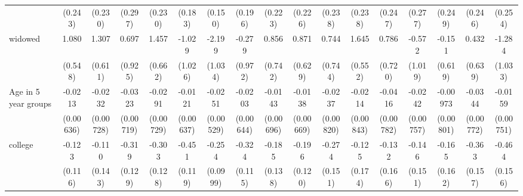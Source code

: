 {\begin{tabular}{l*{16}{c}}
                    &     (0.243)         &     (0.230)         &     (0.297)         &     (0.230)         &     (0.183)         &     (0.150)         &     (0.196)         &     (0.223)         &     (0.226)         &     (0.238)         &     (0.238)         &     (0.247)         &     (0.277)         &     (0.249)         &     (0.246)         &     (0.254)         \\
[1em]
widowed             &       1.080\sym{*}  &       1.307\sym{*}  &       0.697         &       1.457\sym{*}  &      -1.029         &      -2.199\sym{*}  &      -0.279         &       0.856         &       0.871         &       0.744         &       1.645\sym{**} &       0.786         &      -0.572         &      -0.151         &       0.432         &      -1.284         \\
                    &     (0.548)         &     (0.611)         &     (0.925)         &     (0.662)         &     (1.026)         &     (1.034)         &     (0.972)         &     (0.742)         &     (0.629)         &     (0.744)         &     (0.552)         &     (0.720)         &     (1.019)         &     (0.619)         &     (0.639)         &     (1.033)         \\
[1em]
Age in 5 year groups&     -0.0213\sym{***}&     -0.0232\sym{**} &     -0.0323\sym{***}&     -0.0291\sym{***}&     -0.0121         &     -0.0251\sym{***}&     -0.0203\sym{**} &     -0.0143\sym{*}  &     -0.0138\sym{*}  &     -0.0237\sym{**} &     -0.0214\sym{*}  &     -0.0416\sym{***}&     -0.0242\sym{**} &    -0.00973         &     -0.0344\sym{***}&     -0.0159\sym{*}  \\
                    &   (0.00636)         &   (0.00728)         &   (0.00719)         &   (0.00729)         &   (0.00637)         &   (0.00529)         &   (0.00644)         &   (0.00696)         &   (0.00669)         &   (0.00820)         &   (0.00843)         &   (0.00782)         &   (0.00757)         &   (0.00801)         &   (0.00772)         &   (0.00751)         \\
[1em]
college             &      -0.123         &      -0.110         &      -0.319\sym{*}  &      -0.303\sym{*}  &      -0.451\sym{***}&      -0.254\sym{*}  &      -0.324\sym{**} &      -0.185         &      -0.196         &      -0.274         &      -0.125         &      -0.132         &      -0.146         &      -0.165         &      -0.363\sym{*}  &      -0.464\sym{**} \\
                    &     (0.116)         &     (0.143)         &     (0.129)         &     (0.128)         &     (0.119)         &    (0.0999)         &     (0.115)         &     (0.138)         &     (0.120)         &     (0.151)         &     (0.174)         &     (0.166)         &     (0.151)         &     (0.162)         &     (0.157)         &     (0.156)         \\

\end{tabular}}

